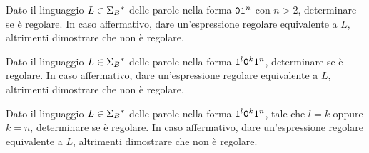 \begin{Exercise}\label{exe:pump-011+}
Dato il linguaggio $L\in\Sigma_{B}{}^{\ast}$ delle parole nella forma $\mathtt{0}\mathtt{1}^{n}$ con $n > 2$, determinare se è
regolare.
In  caso affermativo, dare un'espressione regolare equivalente a $L$, altrimenti dimostrare che non è regolare.
\end{Exercise}

\begin{Exercise}\label{exe:pump-1l0k1n}
Dato il linguaggio $L\in\Sigma_{B}{}^{\ast}$ delle parole nella forma $\mathtt{1}^{l}\mathtt{0}^{k}\mathtt{1}^{n}$, determinare se è
regolare.
In  caso affermativo, dare un'espressione regolare equivalente a $L$, altrimenti dimostrare che non è regolare.
\end{Exercise}

\begin{Exercise}\label{exe:pump-1l0k1n}
Dato il linguaggio $L\in\Sigma_{B}{}^{\ast}$ delle parole nella forma $\mathtt{1}^{l}\mathtt{0}^{k}\mathtt{1}^{n}$, tale che $l=k$ oppure $k=n$,
determinare se è
regolare.
In  caso affermativo, dare un'espressione regolare equivalente a $L$, altrimenti dimostrare che non è regolare.
\end{Exercise}

